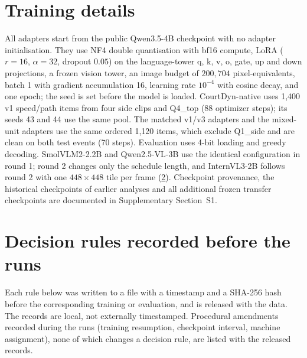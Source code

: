 \documentclass[preprint,number]{elsarticle}
\newcommand{\supp}[1]{Supplementary Section~S#1}
\begin{document}



\appendix
\setcounter{table}{0}
\renewcommand{\thetable}{\thesection.\arabic{table}}

\section{Training details}
\label{app:training}

All adapters start from the public Qwen3.5-4B checkpoint with no adapter
initialisation. They use NF4 double quantisation with bf16 compute, LoRA
($r=16$, $\alpha=32$, dropout $0.05$) on the language-tower q, k, v, o, gate, up
and down projections, a frozen vision tower, an image budget of $200{,}704$
pixel-equivalents, batch 1 with gradient accumulation 16, learning rate
$10^{-4}$ with cosine decay, and one epoch; the seed is set before the model is
loaded. CourtDyn-native uses 1,400 v1 speed/path items from four side clips and
Q4\_top (88 optimizer steps); its seeds 43 and 44 use the same pool. The
matched v1/v3 adapters and the mixed-unit adapters use the same ordered 1,120
items, which exclude Q1\_side and are clean on both test events (70 steps). Evaluation uses 4-bit loading and
greedy decoding. SmolVLM2-2.2B and Qwen2.5-VL-3B use the identical
configuration in round 1; round 2 changes only the schedule length, and
InternVL3-2B follows round 2 with one $448\times448$ tile per frame
(\ref{app:prereg}). Checkpoint provenance, the historical checkpoints of earlier
analyses and all additional frozen transfer checkpoints are documented in
\supp{1}.

\section{Decision rules recorded before the runs}
\label{app:prereg}

Each rule below was written to a file with a timestamp and a SHA-256 hash
before the corresponding training or evaluation, and is released with the
data. The records are local, not externally timestamped. Procedural
amendments recorded during the runs (training resumption, checkpoint interval,
machine assignment), none of which changes a decision rule, are listed with the
released records.
\end{document}
